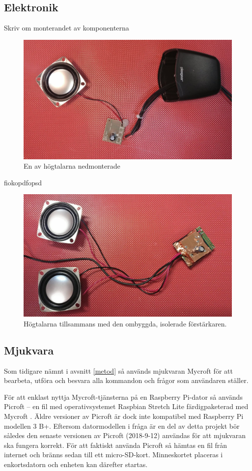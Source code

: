 \subsection{Elektronik}
Skriv om monterandet av komponenterna

\begin{figure}[H]
    \centering
    \caption{\small En av högtalarna nedmonterade}
    \includegraphics[width=12cm]{bilder/speaker_before_change.jpg}
\end{figure}
fiokopdfopsd
\begin{figure}[H]
    \centering
    \caption{\small Högtalarna tillsammans med den ombyggda, isolerade förstärkaren.}
    \includegraphics[width=12cm]{bilder/speakers_and_amplifier.jpg}
\end{figure}

\subsection{Mjukvara}
Som tidigare nämnt i avsnitt \ref{metod} så används mjukvaran Mycroft för att bearbeta, utföra och besvara alla kommandon och frågor som användaren ställer. 

För att enklast nyttja Mycroft-tjänsterna på en Raspberry Pi-dator så används Picroft – en fil med operativsystemet Raspbian Stretch Lite färdig\-paketerad med Mycroft \cite{picroft}. Äldre versioner av Picroft är dock inte kompatibel med Raspberry Pi modellen 3 B+.  Eftersom datormodellen i fråga är en del av detta projekt bör således den senaste versionen av Picroft (2018-9-12) användas för att mjukvaran ska fungera korrekt. För att faktiskt använda Picroft så hämtas en fil från internet och bränns sedan till ett micro-SD-kort. Minneskortet placeras i enkortsdatorn och enheten kan därefter startas.

